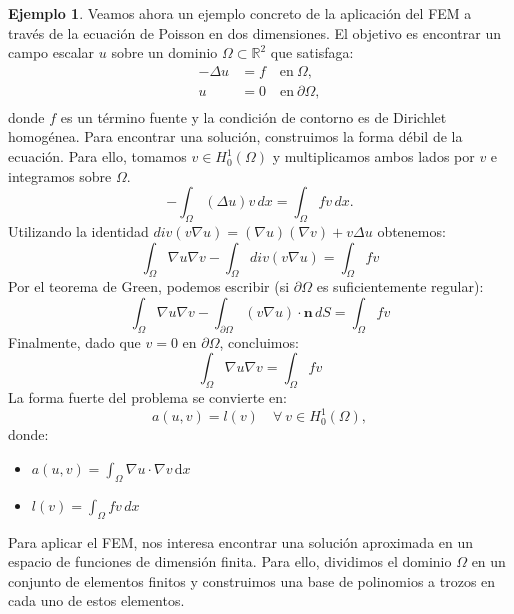 \documentclass[a4paper,11pt,spanish, twoside, leqno]{tfg-uam}
\theoremstyle{definition}
\newtheorem{exmp}[teor]{Ejemplo}
\begin{document}
\begin{mdframed}  
\begin{exmp}\label{ej:fem}
    Veamos ahora un ejemplo concreto de la aplicación del FEM a través de la ecuación de Poisson en dos dimensiones. El objetivo es encontrar un campo escalar $ u $ sobre un dominio $\Omega \subset \mathbb{R}^2$ que satisfaga:
    \begin{equation}
    \begin{aligned}
    - \Delta u &= f \quad \text{en} \ \Omega, \\
    u &= 0 \quad \text{en} \ \partial\Omega, \\
    \end{aligned}
    \end{equation}
    donde $ f $ es un término fuente y la condición de contorno es de Dirichlet homogénea. Para encontrar una solución, construimos la forma débil de la ecuación. Para ello, tomamos $v\in H_0^1(\Omega)$ y multiplicamos ambos lados por $v$ e integramos sobre $\Omega$.
    \begin{equation*}
        -\int_{\Omega} (\Delta u) v \, dx = \int_{\Omega} f v \, dx.
    \end{equation*}
    Utilizando la identidad $div(v\nabla u) = (\nabla u)(\nabla v) + v \Delta u$ obtenemos:
    \begin{equation*}
    \int_{\Omega} \nabla u \nabla v - \int_{\Omega} div(v \nabla u) = \int_{\Omega} f v
    \end{equation*}
    Por el teorema de Green, podemos escribir (si $\partial \Omega$ es suficientemente regular):
    \begin{equation*}
    \int_{\Omega} \nabla u \nabla v - \int_{\partial \Omega} (v \nabla u) \cdot \mathbf{n} \, dS = \int_{\Omega} f v
    \end{equation*}
    Finalmente, dado que $v = 0$ en $\partial \Omega$, concluimos:
    \begin{equation*}
    \int_{\Omega} \nabla u \nabla v = \int_{\Omega} f v
    \end{equation*}
    La forma fuerte del problema se convierte en: 
    \begin{equation}\label{eq:forma_debil_poisson}
    a(u, v) = l(v) \quad \forall \ v \in H_0^1(\Omega),
    \end{equation}
    donde:
    \begin{itemize}
        \item $ a(u, v) = \int_{\Omega} \nabla u \cdot \nabla v \, \text{d}x $
        \item $ l(v) = \int_{\Omega} f v \, dx $
    \end{itemize}
    Para aplicar el FEM, nos interesa encontrar una solución aproximada en un espacio de funciones de dimensión finita. Para ello, dividimos el dominio $\Omega$ en un conjunto de elementos finitos y construimos una base de polinomios a trozos en cada uno de estos elementos. 
    

\end{exmp}
\end{mdframed}
\end{document}
